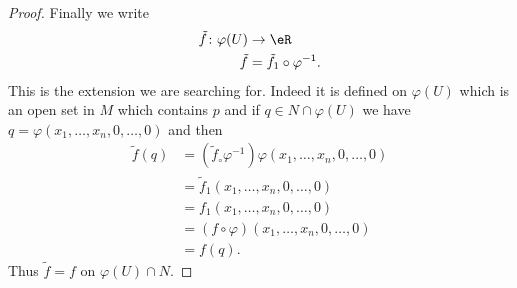 \begin{proof}
	Finally we write
	\begin{equation}
		\begin{aligned}
			\tilde f\colon \varphi(U) & \to \eR                       \\
			\tilde f                  & =\tilde f_1\circ\varphi^{-1}.
		\end{aligned}
	\end{equation}
	This is the extension we are searching for. Indeed it is defined on \( \varphi(U)\) which is an open set in \( M\) which contains \( p\) and if \( q\in N\cap\varphi(U)\) we have \( q=\varphi(x_1,\ldots, x_n,0,\ldots, 0)\) and then
	\begin{subequations}
		\begin{align}
			\tilde f(q) & =(\tilde f_\circ\varphi^{-1})\varphi(x_1,\ldots, x_n,0,\ldots, 0) \\
			            & =\tilde f_1(x_1,\ldots, x_n,0,\ldots, 0)                          \\
			            & =f_1(x_1,\ldots, x_n,0,\ldots, 0)                                 \\
			            & =(f\circ\varphi)(x_1,\ldots, x_n,0,\ldots, 0)                     \\
			            & =f(q).
		\end{align}
	\end{subequations}
	Thus \( \tilde f=f\) on \( \varphi(U)\cap N\).
\end{proof}
